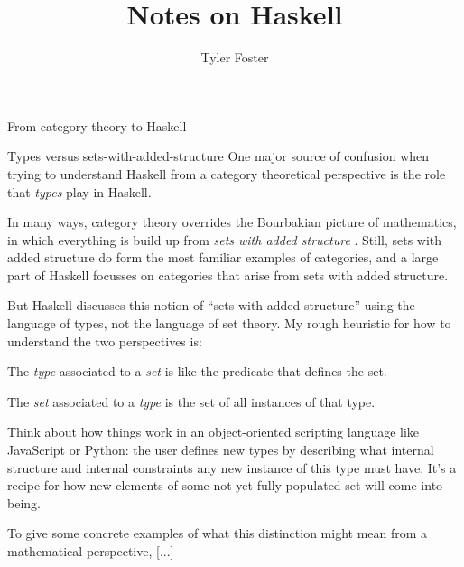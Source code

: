\documentclass[11pt, a4paper]{article}
\begin{document}
\title{Notes on Haskell}

\author{Tyler Foster}

\maketitle

\tableofcontents

\begin{section}{From category theory to Haskell}

\begin{subsection}{Types versus sets-with-added-structure}
One major source of confusion when trying to understand Haskell from a category theoretical perspective is the role that {\em types} play in Haskell.

In many ways, category theory overrides the Bourbakian picture of mathematics, in which everything is build up from {\em sets with added structure} \cite{ToolObject} \cite{Geometric}. Still, sets with added structure do form the most familiar examples of categories, and a large part of Haskell focusses on categories that arise from sets with added structure.

But Haskell discusses this notion of ``sets with added structure'' using the language of types, not the language of set theory. My rough heuristic for how to understand the two perspectives is:
\begin{center}
The {\em type} associated to a {\em set} is like the predicate that defines the set.
\end{center}
\begin{center}
The {\em set} associated to a {\em type} is the set of all instances of that type.
\end{center}

\noindent
Think about how things work in an object-oriented scripting language like JavaScript or Python: the user defines new types by describing what internal structure and internal constraints any new instance of this type must have. It's a recipe for how new elements of some not-yet-fully-populated set will come into being.

To give some concrete examples of what this distinction might mean from a mathematical perspective, [...]

\begin{center}


\end{center}
\end{subsection}
\end{section}
\end{document}
